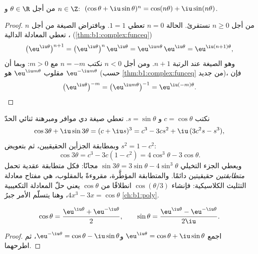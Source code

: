 \begin{corollary}\label{cor:b1:complex:demoivre}
من أجل $\theta \in \R$ و $n \in \Z$:
$\;(\cos\theta + \iu\sin\theta)^n = \cos(n\theta) +
\iu\sin(n\theta)$.
\end{corollary}

\begin{proof}
من أجل $n \geq 0$ نستقرئ. الحالة $n = 0$ تعطي $1 = 1$. وبافتراض
الصيغة من أجل $n$، تعطي المعادلة الدالية
(\cref{thm:b1:complex:funceq})
\[
\bigl(\eu^{\iu\theta}\bigr)^{n+1}
= \bigl(\eu^{\iu\theta}\bigr)^{n}\,\eu^{\iu\theta}
= \eu^{\iu n\theta}\,\eu^{\iu\theta}
= \eu^{\iu(n+1)\theta} ,
\]
وهو الصيغة عند الرتبة $n + 1$. ومن أجل $n < 0$ نكتب $n = -m$
مع $m > 0$: وبما أن مقلوب $\eu^{\iu m\theta}$ هو
$\eu^{-\iu m\theta}$ (حسب \cref{thm:b1:complex:funceq} من جديد)، فإن
\[
\bigl(\eu^{\iu\theta}\bigr)^{-m}
= \bigl(\eu^{\iu m\theta}\bigr)^{-1}
= \eu^{\iu(-m)\theta} . \qedhere
\]
\end{proof}

\begin{example}\label{ex:b1:complex:cos3}
نكتب $c = \cos\theta$ و $s = \sin\theta$. تعطي صيغة دي موافر ومبرهنة
ثنائي الحدّ
\[
\cos 3\theta + \iu \sin 3\theta = (c + \iu s)^3
= c^3 - 3cs^2 + \iu\,(3c^2 s - s^3),
\]
وبمطابقة الجزأين الحقيقيين، ثم بتعويض $s^2 = 1 - c^2$:
\[
\cos 3\theta = c^3 - 3c(1 - c^2) = 4\cos^3\theta - 3\cos\theta .
\]
ويعطي الجزء التخيلي $\sin 3\theta = 3\sin\theta -
4\sin^3\theta$ مجانًا: فكل متطابقة عقدية تحمل \emph{متطابقتين}
حقيقيتين دائمًا. والمتطابقة المؤطَّرة، مقروءةً بالمقلوب، هي
مفتاح معادلة التثليث الكلاسيكية: فإنشاء
$\cos(\theta/3)$ انطلاقًا من $\cos\theta$ يعني حلّ المعادلة
التكعيبية $4x^3 -
3x = \cos\theta$، وهنا يتسلّم الأمر جبرُ
\cref{ch:b1:poly}.
\end{example}

\begin{proposition}\label{prop:b1:complex:euler}
\[
\cos\theta = \frac{\eu^{\iu\theta} + \eu^{-\iu\theta}}{2},
\qquad
\sin\theta = \frac{\eu^{\iu\theta} - \eu^{-\iu\theta}}{2\iu}.
\]
\end{proposition}

\begin{proof}
اجمع $\eu^{\iu\theta} = \cos\theta +
\iu\sin\theta$ و$\eu^{-\iu\theta} = \cos\theta - \iu\sin\theta$، ثم اطرحهما.
\end{proof}

